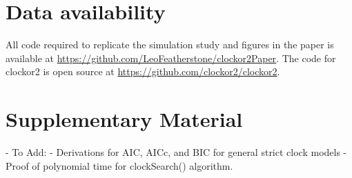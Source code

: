 \documentclass{article}
\begin{document}

\section*{Data availability}
All code required to replicate the simulation study and figures in the paper is available at \url{https://github.com/LeoFeatherstone/clockor2Paper}. The code for clockor2 is open source at \url{https://github.com/clockor2/clockor2}.



\section*{Supplementary Material}
- To Add:
- Derivations for AIC, AICc, and BIC for general strict clock models
- Proof of polynomial time for clockSearch() algorithm.
\end{document}
